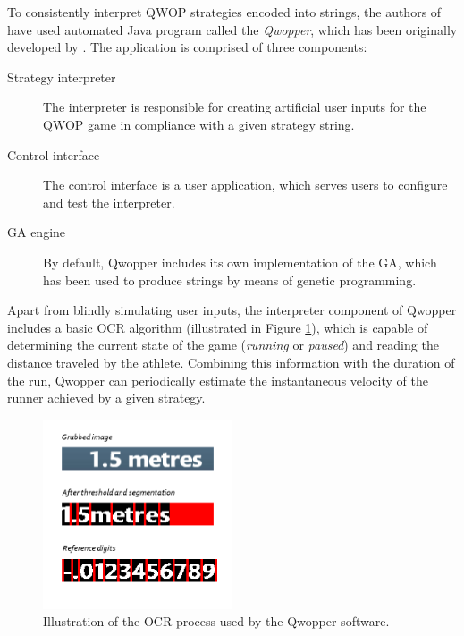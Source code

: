 To consistently interpret QWOP strategies encoded into strings, the authors of \cite{EvolvingQwopGaits} have used automated Java program called the \textit{Qwopper}, which has been originally developed by \cite{QwopEncoding}. The application is comprised of three components:
~
\begin{description}
	\item[Strategy interpreter]
	The interpreter is responsible for creating artificial user inputs for the QWOP game in compliance with a given strategy string.

	\item[Control interface]
	The control interface is a user application, which serves users to configure and test the interpreter.

	\item[GA engine]
	By default, Qwopper includes its own implementation of the GA, which has been used to produce strings by means of genetic programming.
\end{description}

Apart from blindly simulating user inputs, the interpreter component of Qwopper includes a basic OCR algorithm (illustrated in Figure \ref{figure:QWOP-OCR}), which is capable of determining the current state of the game (\textit{running} or \textit{paused}) and reading the distance traveled by the athlete. Combining this information with the duration of the run, Qwopper can periodically estimate the instantaneous velocity of the runner achieved by a given strategy.

\begin{figure}[ht]
	\centering
	\includegraphics[width=0.5\textwidth]{img/reading_digits.png}
	\caption[OCR process used by the Qwopper software.]{Illustration of the OCR process used by the Qwopper software. \cite{QwopEncoding}}
	\label{figure:QWOP-OCR}
\end{figure}

